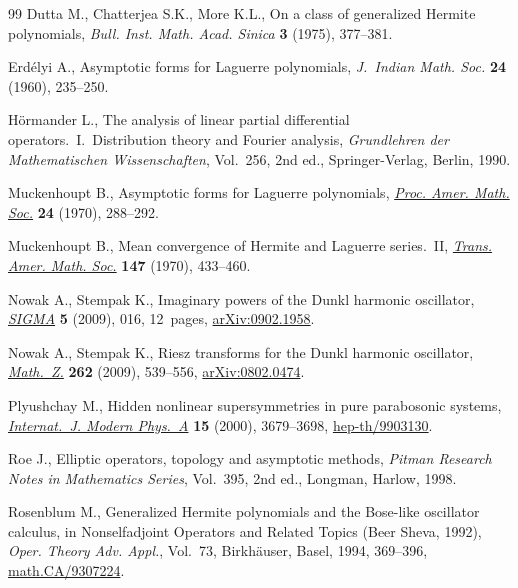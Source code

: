 \documentclass[11pt]{article}
\begin{document}
\begin{thebibliography}{99}
Dutta M., Chatterjea S.K., More K.L., On a class of generalized {H}ermite
  polynomials, \textit{Bull. Inst. Math. Acad. Sinica} \textbf{3} (1975),
  377--381.

Erd{\'e}lyi A., Asymptotic forms for {L}aguerre polynomials, \textit{J.~Indian
  Math. Soc.} \textbf{24} (1960), 235--250.

H{\"o}rmander L., The analysis of linear partial dif\/ferential operators.~{I}.~Distribution theory and Fourier ana\-lysis,
  \textit{Grundlehren der Mathematischen Wissenschaften}, Vol.~256, 2nd ed.,
  Springer-Verlag, Berlin, 1990.

Muckenhoupt B., Asymptotic forms for {L}aguerre polynomials, \href{http://dx.doi.org/10.1090/S0002-9939-1970-0251272-9}{\textit{Proc.
  Amer. Math. Soc.}} \textbf{24} (1970), 288--292.

Muckenhoupt B., Mean convergence of {H}ermite and {L}aguerre series.~{II},
  \href{http://dx.doi.org/10.1090/S0002-9947-1970-0256051-9}{\textit{Trans. Amer. Math. Soc.}} \textbf{147} (1970), 433--460.

Nowak A., Stempak K., Imaginary powers of the {D}unkl harmonic oscillator,
  \href{http://dx.doi.org/10.3842/SIGMA.2009.016}{\textit{SIGMA}} \textbf{5} (2009), 016, 12~pages, \href{http://arxiv.org/abs/0902.1958}{arXiv:0902.1958}.

Nowak A., Stempak K., Riesz transforms for the {D}unkl harmonic oscillator,
  \href{http://dx.doi.org/10.1007/s00209-008-0388-4}{\textit{Math.~Z.}} \textbf{262} (2009), 539--556, \href{http://arxiv.org/abs/0802.0474}{arXiv:0802.0474}.

Plyushchay M., Hidden nonlinear supersymmetries in pure parabosonic systems,
  \href{http://dx.doi.org/10.1142/S0217751X0000198X}{\textit{Internat.~J. Modern Phys.~A}} \textbf{15} (2000), 3679--3698,
  \href{http://arxiv.org/abs/hep-th/9903130}{hep-th/9903130}.

Roe J., Elliptic operators, topology and asymptotic methods, \textit{Pitman
  Research Notes in Mathematics Series}, Vol.~395, 2nd ed., Longman, Harlow,
  1998.

Rosenblum M., Generalized {H}ermite polynomials and the {B}ose-like oscillator
  calculus, in Nonselfadjoint Operators and Related Topics ({B}eer {S}heva,
  1992), \textit{Oper. Theory Adv. Appl.}, Vol.~73, Birkh\"auser, Basel, 1994,
  369--396, \href{http://arxiv.org/abs/math.CA/9307224}{math.CA/9307224}.


\end{thebibliography}
\end{document}
